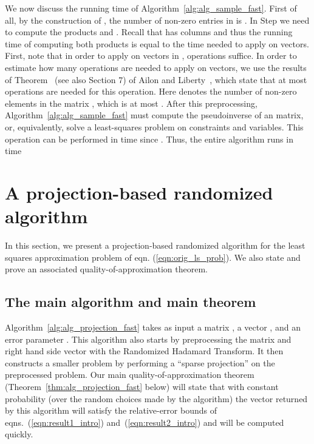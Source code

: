 \documentclass[11pt]{article}
\begin{document}
We now discuss the running time of Algorithm~\ref{alg:alg_sample_fast}. First of all, by the construction of , the number of non-zero entries in  is . In Step  we need to compute the products  and . Recall that  has  columns and thus the running time of computing both products is equal to the time needed to apply  on  vectors. First, note that in order to apply  on  vectors in ,  operations suffice. In order to estimate how many operations are needed to apply  on  vectors, we use the results of Theorem~ (see also Section 7) of Ailon and Liberty~\cite{AL08}, which state that at most  operations are needed for this operation. Here  denotes the number of non-zero elements in the matrix , which is at most . After this preprocessing, Algorithm~\ref{alg:alg_sample_fast} must compute the pseudoinverse of an  matrix, or, equivalently, solve a least-squares problem on  constraints and  variables. This operation can be performed in  time since . Thus, the entire algorithm runs in time



\section{A projection-based randomized algorithm}
\label{sxn:projection}

In this section, we present a projection-based randomized algorithm for the least squares approximation problem of eqn. (\ref{eqn:orig_ls_prob}). We also state and prove an associated quality-of-approximation theorem.

\subsection{The main algorithm and main theorem}
\label{sxn:projection:result}

Algorithm~\ref{alg:alg_projection_fast} takes as input a matrix , a vector , and an error parameter . This algorithm also starts by preprocessing the matrix  and right hand side vector  with the Randomized Hadamard Transform. It then constructs a smaller problem by performing a ``sparse projection'' on the preprocessed problem. Our main quality-of-approximation theorem (Theorem~\ref{thm:alg_projection_fast} below) will state that with constant probability (over the random choices made by the algorithm) the vector
 returned by this algorithm will satisfy the relative-error bounds of eqns.~(\ref{eqn:result1_intro}) and~(\ref{eqn:result2_intro}) and will be computed quickly.
\end{document}
